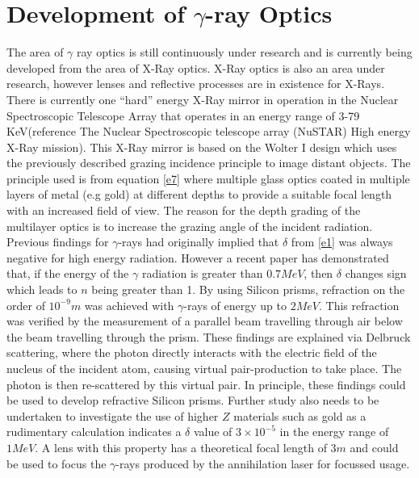 \section{Development of $\gamma$-ray Optics}
The area of $\gamma$ ray optics is still continuously under research and is currently being developed from the area of  X-Ray optics. X-Ray optics is also an area under research, however lenses and reflective processes are in existence for X-Rays. There is currently one “hard” energy X-Ray mirror in operation in the Nuclear Spectroscopic Telescope Array that operates in an energy range of 3-79 KeV(reference The Nuclear Spectroscopic telescope array (NuSTAR) High energy X-Ray mission). This X-Ray mirror is based on the Wolter I design which uses the previously described grazing incidence principle to image distant objects. The principle used is from equation \ref{e7} where multiple glass optics coated in multiple layers of metal (e.g gold) at different depths to provide a suitable focal length with an increased field of view. The reason for the depth grading of the multilayer optics is to increase the grazing angle of the incident radiation. 
\newline
\newline
Previous findings for $\gamma$-rays had originally implied that $\delta$ from \ref{e1} was always negative for high energy radiation. However a recent paper has demonstrated that, if the energy of the $\gamma$ radiation is greater than $0.7 MeV$, then $\delta$ changes sign which leads to $n$ being greater than 1. By using Silicon prisms, refraction on the order of $10^{-9}m$ was achieved with $\gamma$-rays of energy up to $2 MeV$. This refraction was verified by the measurement of a parallel beam travelling through air below the beam travelling through the prism. These findings are explained via Delbruck scattering, where the photon directly interacts with the electric field of the nucleus of the incident atom, causing virtual pair-production to take place. The photon is then re-scattered by this virtual pair. In principle, these findings could be used to develop refractive Silicon prisms. Further study also needs to be undertaken to investigate the use of higher $Z$ materials such as gold as a rudimentary calculation indicates a $\delta$ value of $3\times10^{-5}$ in the energy range of $1 MeV$. A lens with this property has a theoretical focal length of $3m$ and could be used to focus the $\gamma$-rays produced by the annihilation laser for focussed usage.
\newline 
\newline
